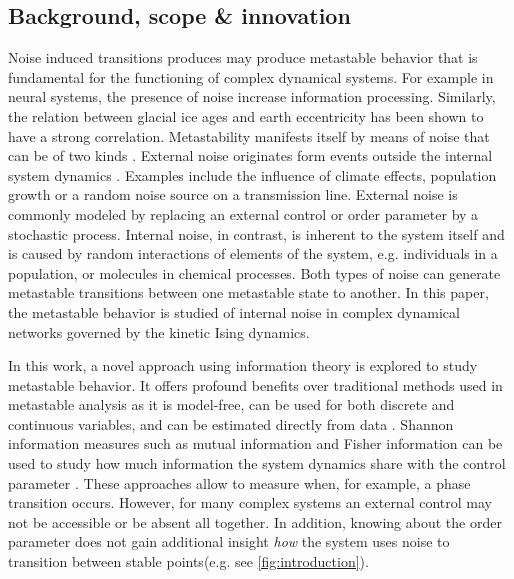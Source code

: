 \documentclass[a4paper, 11pt, twocolumn]{article}
\begin{document}
\subsection{Background, scope \& innovation}
\label{sec:orgd888f8c}
Noise  induced transitions  produces may  produce metastable
behavior that is fundamental  for the functioning of complex
dynamical  systems.  For  example  in  neural  systems,  the
presence   of   noise   increase   information   processing.
Similarly, the  relation between glacial ice  ages and earth
eccentricity has  been shown  to have a  strong correlation.
Metastability manifests itself by means of noise that can be
of two  kinds \cite{Forgoston2018}. External  noise originates
form   events   outside   the   internal   system   dynamics
\cite{Calim2021,Czaplicka2013a}.    Examples    include    the
influence of climate effects,  population growth or a random
noise  source  on a  transmission  line.  External noise  is
commonly modeled  by replacing an external  control or order
parameter  by  a  stochastic  process.  Internal  noise,  in
contrast, is inherent to the  system itself and is caused by
random  interactions   of  elements  of  the   system,  e.g.
individuals  in  a  population,  or  molecules  in  chemical
processes.  Both  types  of noise  can  generate  metastable
transitions between one metastable state to another. In this
paper, the metastable behavior is studied of internal noise
in complex dynamical networks  governed by the kinetic Ising
dynamics.

In this  work, a novel  approach using information  theory is
explored to  study metastable  behavior. It  offers profound
benefits  over   traditional  methods  used   in  metastable
analysis as it is model-free,  can be used for both discrete
and continuous variables, and can be estimated directly from
data  \cite{Cover2005}. Shannon  information measures  such as
mutual  information and  Fisher information  can be  used to
study how  much information  the system dynamics  share with
the  control  parameter  \cite{Nicolis2016,Lizier2010}.  These
approaches  allow  to measure  when,  for  example, a  phase
transition  occurs. However,  for  many  complex systems  an
external  control may  not be  accessible or  be absent  all
together.  In addition,  knowing about  the order  parameter
does not gain additional insight \emph{how} the system uses noise
to    transition    between     stable    points(e.g.    see
\cref{fig:introduction}).
\end{document}
